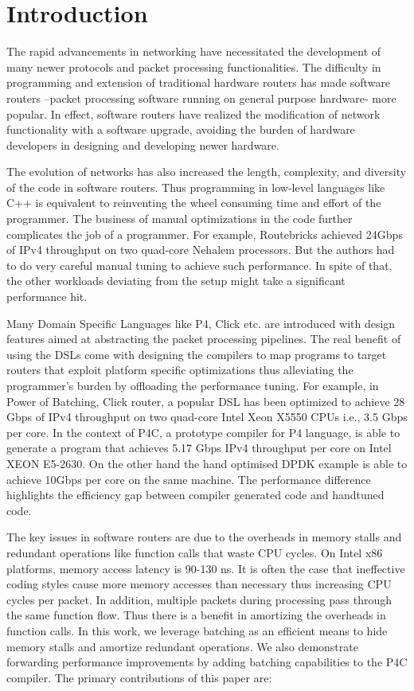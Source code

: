 \section{Introduction}

The rapid advancements in networking have necessitated the development of many newer protocols and packet processing functionalities. The difficulty in programming and extension of traditional hardware routers has made software routers --packet processing software running on general purpose hardware- more popular. In effect, software routers have realized the modification of network functionality with a software upgrade, avoiding the burden of hardware developers in designing and developing newer hardware.

The evolution of networks has also increased the length, complexity, and diversity of the code in software routers. Thus programming in low-level languages like C++ is equivalent to reinventing the wheel consuming time and effort of the programmer. The business of manual optimizations in the code further complicates the job of a programmer. For example, Routebricks achieved 24Gbps of IPv4 throughput on two quad-core Nehalem processors. But the authors had to do very careful manual tuning to achieve such performance. In spite of that, the other workloads deviating from the setup might take a significant performance hit.

Many Domain Specific Languages like P4\cite{Bosshart:2014:PPP:2656877.2656890}, Click\cite{kohler2000click} etc. are introduced with design features aimed at abstracting the packet processing pipelines. The real benefit of using the DSLs come with designing the compilers to map programs to target routers that exploit platform specific optimizations thus alleviating the programmer's burden by offloading the performance tuning. For example, in Power of Batching\cite{Kim:2012:PBC:2349896.2349910}, Click router, a popular DSL has been optimized to achieve 28 Gbps of IPv4 throughput on two quad-core Intel Xeon X5550 CPUs i.e., 3.5 Gbps per core. In the context of P4C, a prototype compiler for P4 language, is able to generate a program that achieves 5.17 Gbps IPv4 throughput per core on Intel XEON E5-2630. On the other hand the hand optimised DPDK example is able to achieve 10Gbps per core on the same machine. The performance difference highlights the efficiency gap between compiler generated code and handtuned code.

The key issues in software routers are due to the overheads in memory stalls and redundant operations like function calls that waste CPU cycles. On Intel x86 platforms, memory access latency is 90-130 ns. It is often the case that ineffective coding styles cause more memory accesses than necessary thus increasing CPU cycles per packet.  In addition, multiple packets during processing pass through the same function flow. Thus there is a benefit in amortizing the overheads in function calls. In this work, we leverage batching as an efficient means to hide memory stalls and amortize redundant operations. We also demonstrate forwarding performance improvements by adding batching capabilities to the P4C compiler. The primary contributions of this paper are:

